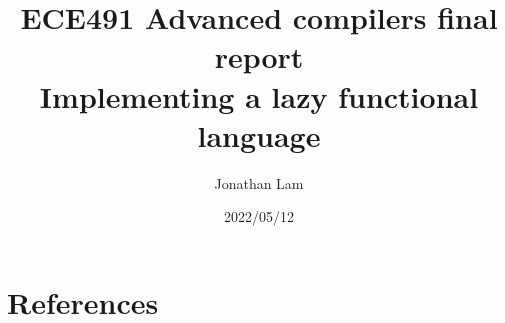 \documentclass{article}
\title{
  ECE491 Advanced compilers final report \\
  Implementing a lazy functional language
}
\author{Jonathan Lam}
\date{2022/05/12}
\begin{document}
\maketitle{}

\tableofcontents{}









\section{References}
\label{sec:references}

\printbibliography[heading=none]{}
\end{document}
